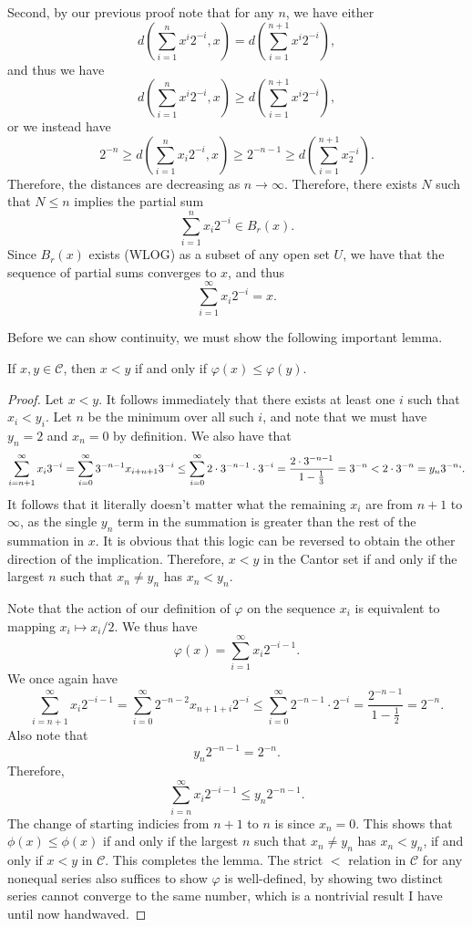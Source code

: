 \documentclass[11pt, letterpaper]{article}
\begin{document}
Second, by our previous proof note that for any $n$, we have either
\[
	d\left( \sum_{i=1}^{n} x^i2^{-i} ,x \right) =d\left( \sum_{i=1}^{n+1} x^i2^{-i}  \right) ,
\]
and thus we have
\[
	d\left( \sum_{i=1}^{n} x^i2^{-i} ,x \right) \geq d\left( \sum_{i=1}^{n+1} x^i2^{-i}  \right) ,
\]
or we instead have
\[
	2^{-n} \geq d\left( \sum_{i=1}^{n} x_i2^{-i} ,x \right) \geq 2^{-n-1} \geq d\left( \sum_{i=1}^{n+1} x_2^{-i}  \right)  
.\]
Therefore, the distances are decreasing as $n\to \infty $. Therefore, there exists $N$ such that $N\leq n$ implies the partial sum
\[
	\sum_{i=1}^{n} x_i2^{-i} \in B_r(x)
.\]
Since $B_r(x)$ exists (WLOG) as a subset of any open set $U$, we have that the sequence of partial sums converges to $x$, and thus
\[
	\sum_{i=1}^{\infty} x_i2^{-i}=x
.\]

Before we can show continuity, we must show the following important lemma.
\begin{lemma}\label{lma:1.1}
	If $x,y\in \mathcal{C} $, then $x<y$ if and only if $\varphi (x)\leq \varphi (y)$.
\end{lemma}
\begin{proof}
Let $x<y$. It follows immediately that there exists at least one $i$ such that $x_i<y_i$. Let $n$ be the minimum over all such $i$, and note that we must have $y_n=2$ and $x_n=0$ by definition. We also have that
\[
	\sum_{i=n+1}^{\infty} x_i3^{-i} =\sum_{i=0}^{\infty} 3^{-n-1} x_{i+n+1}3^{-i} \leq \sum_{i=0}^{\infty} 2\cdot 3^{-n-1} \cdot 3^{-i} =\frac{2\cdot 3^{-n-1} }{1-\frac{1}{3} } =3^{-n} < 2\cdot 3^{-n} =y_n3^{-n} `
.\]
It follows that it literally doesn't matter what the remaining $x_i$ are from $n+1$ to $\infty $, as the single $y_n$ term in the summation is greater than the rest of the summation in $x$. It is obvious that this logic can be reversed to obtain the other direction of the implication. Therefore, $x < y$ in the Cantor set if and only if the largest $n$ such that $x_n\neq y_n$ has $x_n<y_n$.

Note that the action of our definition of $\varphi $ on the sequence $x_i$ is equivalent to mapping $x_i \mapsto x_i/2$. We thus have
\[
	\varphi (x)=\sum_{i=1}^{\infty} x_i2^{-i-1} 
.\]
We once again have
\[
	\sum_{i=n+1}^{\infty} x_i2^{-i-1} =\sum_{i=0}^{\infty} 2^{-n-2} x_{n+1+i} 2^{-i} \leq \sum_{i=0}^{\infty } 2^{-n-1} \cdot 2^{-i} =\frac{2^{-n-1} }{1-\frac{1}{2} } =2^{-n} 
.\]
Also note that
\[
	y_n2^{-n-1} =2^{-n} 
.\]
Therefore,
\[
	\sum_{i=n}^{\infty} x_i2^{-i-1} \leq y_n2^{-n-1} 
.\]
The change of starting indicies from $n+1$ to $n$ is since $x_n=0$. This shows that $\phi (x) \leq \phi (x)$ if and only if the largest $n$ such that $x_n\neq y_n$ has $x_n<y_n$, if and only if $x < y$ in $\mathcal{C} $. This completes the lemma. The strict $<$ relation in $\mathcal{C} $ for any nonequal series also suffices to show $\varphi $ is well-defined, by showing two distinct series cannot converge to the same number, which is a nontrivial result I have until now handwaved.
\end{proof}
\end{document}
